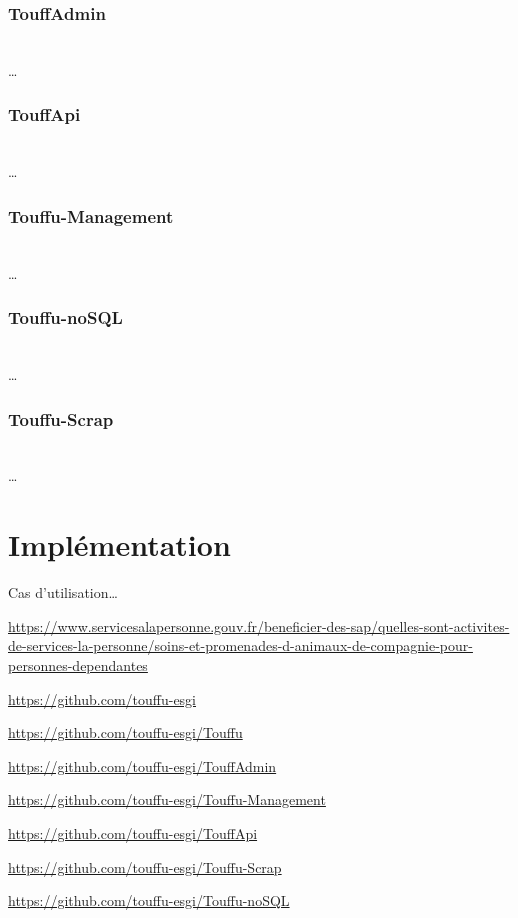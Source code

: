 \documentclass[conference]{IEEEtran}
\begin{document}
\subsubsection*{TouffAdmin}
\hfil\\
…\\

\subsubsection*{TouffApi}
\hfil\\
…\\

\subsubsection*{Touffu-Management}
\hfil\\
…\\

\subsubsection*{Touffu-noSQL}
\hfil\\
…\\

\subsubsection*{Touffu-Scrap}
\hfil\\
…\\

\section{Implémentation}

{Cas d'utilisation…}


\begin{thebibliography}{00}

\url{https://www.servicesalapersonne.gouv.fr/beneficier-des-sap/quelles-sont-activites-de-services-la-personne/soins-et-promenades-d-animaux-de-compagnie-pour-personnes-dependantes}

\url{https://github.com/touffu-esgi}

\url{https://github.com/touffu-esgi/Touffu}

\url{https://github.com/touffu-esgi/TouffAdmin}

\url{https://github.com/touffu-esgi/Touffu-Management}

\url{https://github.com/touffu-esgi/TouffApi}

\url{https://github.com/touffu-esgi/Touffu-Scrap}

\url{https://github.com/touffu-esgi/Touffu-noSQL}

\end{thebibliography}
\end{document}

